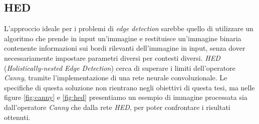 \subsection{HED}
\label{subsec:hed}
L'approccio ideale per i problemi di \textit{edge detection} sarebbe quello di utilizzare un algoritmo che prende in input un'immagine e restituisce un'immagine binaria contenente informazioni sui bordi rilevanti dell'immagine in input, senza dover necessariamente impostare parametri diversi per contesti diversi.
\textit{HED} (\textit{Holistically-nested Edge Detection}) \cite{bib:hed} cerca di superare i limiti dell'operatore \textit{Canny}, tramite l'implementazione di una rete neurale convoluzionale. Le specifiche di questa soluzione non rientrano negli obiettivi di questa tesi, ma nelle figure \ref{fig:canny} e \ref{fig:hed} presentiamo un esempio di immagine processata sia dall'operatore \textit{Canny} che dalla rete \textit{HED}, per poter confrontare i risultati ottenuti.
